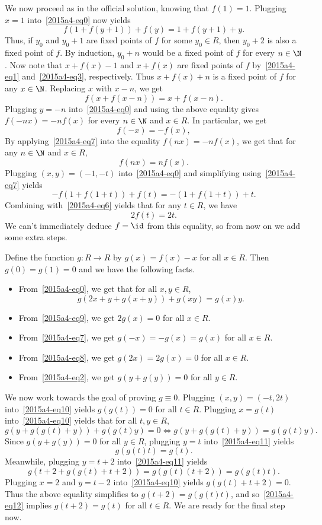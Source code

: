 We now proceed as in the official solution, knowing that $f(1) = 1$.
Plugging $x = 1$ into~\eqref{2015a4-eq0} now yields
\[ f(1 + f(y + 1)) + f(y) = 1 + f(y + 1) + y. \tag{6}\label{2015a4-eq6} \]
Thus, if $y_0$ and $y_0 + 1$ are fixed points of $f$ for some $y_0 \in R$, then $y_0 + 2$ is also a fixed point of $f$.
By induction, $y_0 + n$ would be a fixed point of $f$ for every $n \in \N$.
Now note that $x + f(x) - 1$ and $x + f(x)$ are fixed points of $f$ by~\eqref{2015a4-eq1} and~\eqref{2015a4-eq3}, respectively.
Thus $x + f(x) + n$ is a fixed point of $f$ for any $x \in \N$.
Replacing $x$ with $x - n$, we get
\[ f(x + f(x - n)) = x + f(x - n). \]
Plugging $y = -n$ into~\eqref{2015a4-eq0} and using the above equality gives $f(-nx) = -n f(x)$ for every $n \in \N$ and $x \in R$.
In particular, we get
\[ f(-x) = -f(x), \tag{7}\label{2015a4-eq7} \]
By applying~\eqref{2015a4-eq7} into the equality $f(nx) = -n f(x)$, we get that for any $n \in \N$ and $x \in R$,
\[ f(nx) = n f(x). \tag{8}\label{2015a4-eq8} \]
Plugging $(x, y) = (-1, -t)$ into~\eqref{2015a4-eq0} and simplifying using~\eqref{2015a4-eq7} yields
\[ -f(1 + f(1 + t)) + f(t) = -(1 + f(1 + t)) + t. \]
Combining with~\eqref{2015a4-eq6} yields that for any $t \in R$, we have
\[ 2 f(t) = 2t. \tag{9}\label{2015a4-eq9} \]
We can't immediately deduce $f = \id$ from this equality, so from now on we add some extra steps.

Define the function $g : R \to R$ by $g(x) = f(x) - x$ for all $x \in R$.
Then $g(0) = g(1) = 0$ and we have the following facts.
\begin{itemize}
    \item   From~\eqref{2015a4-eq0}, we get that for all $x, y \in R$,
            \[ g(2x + y + g(x + y)) + g(xy) = g(x) y. \tag{10}\label{2015a4-eq10} \]
    \item   From~\eqref{2015a4-eq9}, we get $2 g(x) = 0$ for all $x \in R$.
    \item   From~\eqref{2015a4-eq7}, we get $g(-x) = -g(x) = g(x)$ for all $x \in R$.
    \item   From~\eqref{2015a4-eq8}, we get $g(2x) = 2 g(x) = 0$ for all $x \in R$.
    \item   From~\eqref{2015a4-eq2}, we get $g(y + g(y)) = 0$ for all $y \in R$.
\end{itemize}

We now work towards the goal of proving $g \equiv 0$.
Plugging $(x, y) = (-t, 2t)$ into~\eqref{2015a4-eq10} yields $g(g(t)) = 0$ for all $t \in R$.
Plugging $x = g(t)$ into~\eqref{2015a4-eq10} yields that for all $t, y \in R$,
\[ g(y + g(g(t) + y)) + g(g(t) y) = 0 \iff g(y + g(g(t) + y)) = g(g(t) y). \tag{11}\label{2015a4-eq11} \]
Since $g(y + g(y)) = 0$ for all $y \in R$, plugging $y = t$ into~\eqref{2015a4-eq11} yields
\[ g(g(t) t) = g(t). \tag{12}\label{2015a4-eq12} \]
Meanwhile, plugging $y = t + 2$ into~\eqref{2015a4-eq11} yields
\[ g(t + 2 + g(g(t) + t + 2)) = g(g(t) (t + 2)) = g(g(t) t). \]
Plugging $x = 2$ and $y = t - 2$ into~\eqref{2015a4-eq10} yields $g(g(t) + t + 2) = 0$.
Thus the above equality simplifies to $g(t + 2) = g(g(t) t)$, and so~\eqref{2015a4-eq12} implies $g(t + 2) = g(t)$ for all $t \in R$.
We are ready for the final step now.

